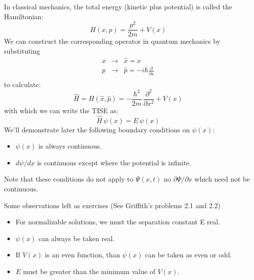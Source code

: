 \documentclass[12pt]{book}
\begin{document}
In classical mechanics, the total energy (kinetic plus potential) is called the Hamiltonian:
\begin{equation*}
H(x,p) = \frac{p^2}{2m} + V(x)
\end{equation*}
We can construct the corresponding operator in quantum mechanics by substituting 
\begin{eqnarray*}
x &\to& \hat{x} = x \\
p &\to& \hat{p} = -i\hbar \frac{\partial}{\partial x} \\
\end{eqnarray*}
to calculate:
\begin{equation}
\hat{H} = H(\hat{x}, \hat{p})= -\frac{\hbar^2}{2m}\,\frac{\partial^2}{\partial x^2} + V(x)
\end{equation}
with which we can write the TISE as:
\begin{equation}
\label{eqn:htise}
\hat{H} \, \psi(x) = E \, \psi(x)
\end{equation}
We'll demonstrate later the following boundary conditions on $\psi(x)$:
\begin{itemize}
\item $\psi(x)$ is always continuous.
\item $d\psi/dx$ is continuous except where the potential is infinite.
\end{itemize}
Note that these conditions do not apply to $\Psi(x,t)$ no $\partial \Psi / \partial x$ which need not be continuous.

\noindent
Some observations left as exercises (See Griffith's problems 2.1 and 2.2)
\begin{itemize}
\item For normalizable solutions, we must the separation constant E real.
\item $\psi(x)$ can always be taken real.
\item If $V(x)$ is an even function, than $\psi(x)$ can be taken as even or odd.
\item $E$ must be greater than the minimum value of $V(x)$.
\end{itemize}
\end{document}

